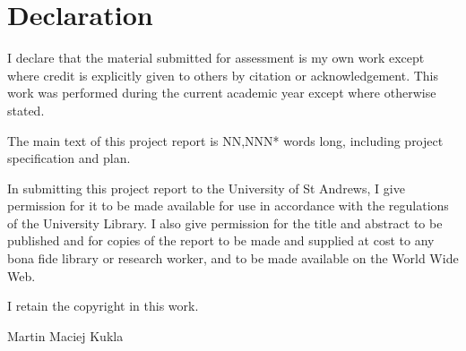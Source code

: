 \section*{Declaration}

\noindent I declare that the material submitted for assessment is my own work except where credit is explicitly given to others by citation or acknowledgement. This work was performed during the current academic year except where otherwise stated. 

\vspace{20pt}

\noindent The main text of this project report is NN,NNN* words long, including project specification and plan. 


\vspace{20pt}

\noindent In submitting this project report to the University of St Andrews, I give permission for it to be made available for use in accordance with the regulations of the University Library. I also give permission for the title and abstract to be published and for copies of the report to be made and supplied at cost to any bona fide library or research worker, and to be made available on the World Wide Web. 


\vspace{20pt}

\noindent I retain the copyright in this work. 


\vspace{20pt}

\noindent Martin Maciej Kukla
